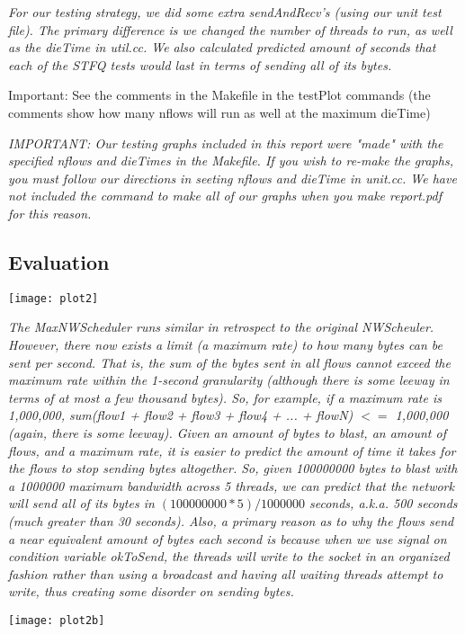 \documentclass[11pt, letterpaper]{article}
\begin{document}
{\em For our testing strategy, we did some extra sendAndRecv's
(using our unit test file). The primary difference is we changed
the number of threads to run, as well as the dieTime in util.cc. We also calculated predicted amount
of seconds that each of the STFQ tests would last in terms of sending
all of its bytes.

Important: See the comments in the Makefile in the testPlot commands
(the comments show how many nflows will run as well at the maximum dieTime)}

{\em IMPORTANT: Our testing graphs included in this report were "made" with the specified 
nflows and dieTimes in the Makefile. If you wish to re-make the graphs, you must follow 
our directions in seeting nflows and dieTime in unit.cc. We have not included the command 
to make all of our graphs when you make report.pdf for this reason.}


\subsection{Evaluation}

\centerline{\texttt{[image: plot2]}}

{\em The MaxNWScheduler runs similar in retrospect to the original NWScheuler. However, there now exists a limit (a maximum rate) to how many bytes can be sent per second.
That is, the sum of the bytes sent in all flows cannot exceed the maximum rate within the 1-second granularity (although there is some leeway in terms of at most a few
thousand bytes). So, for example, if a maximum rate is 1,000,000, sum(flow1 + flow2 + flow3 + flow4 + ... + flowN) $<=$ 1,000,000 (again, there is some leeway).
Given an amount of bytes to blast, an amount of flows, and a maximum rate, it is easier to predict the amount of time it takes for the flows to stop
sending bytes altogether. So, given 100000000 bytes to blast with a 1000000 maximum bandwidth across 5 threads, we can predict that the network will send all of its bytes
in $(100000000*5)/1000000$ seconds, a.k.a. 500 seconds (much greater than 30 seconds). Also, a primary reason as to why the flows send a near equivalent
amount of bytes each second is because when we use signal on condition variable okToSend, the threads will write to the socket in an organized fashion 
rather than using a broadcast and having all waiting threads attempt to write, thus creating some disorder on sending bytes.}


\centerline{\texttt{[image: plot2b]}}
\end{document}
